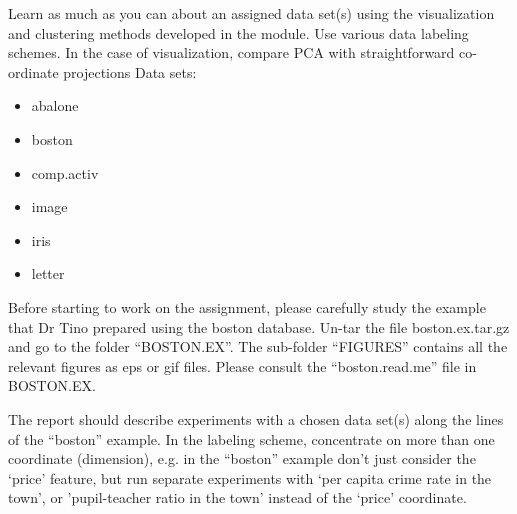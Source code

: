 \documentclass[preprint,12pt]{elsarticle}
\begin{document}
Learn as much as you can about an assigned data set(s) using the visualization and clustering methods developed in the module.
Use various data labeling schemes.
In the case of visualization, compare PCA with straightforward co-ordinate projections
Data sets:

\begin{itemize}
    \item abalone
    \item boston
    \item comp.activ
    \item image
    \item iris
    \item letter
\end{itemize}

Before starting to work on the assignment, please carefully study the example that Dr Tino prepared using the boston database. Un-tar the file boston.ex.tar.gz and go to the folder ``BOSTON.EX''.   The sub-folder ``FIGURES'' contains all the relevant figures as eps or gif files. Please consult the ``boston.read.me'' file in BOSTON.EX.

The report should describe experiments with a chosen data set(s) along the lines of the ``boston'' example.  In the labeling scheme, concentrate on more than one coordinate (dimension), e.g. in the ``boston'' example don't just consider the `price' feature, but run separate experiments with `per capita crime rate in the town', or 'pupil-teacher ratio in the town' instead of the `price' coordinate.
\end{document}
